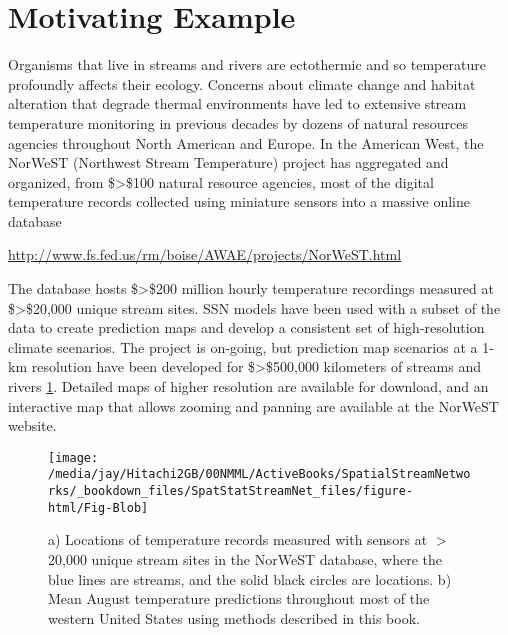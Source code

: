 \documentclass[]{book}
\theoremstyle{definition}
\theoremstyle{definition}
\theoremstyle{definition}
\theoremstyle{remark}
\begin{document}
\hypertarget{motivating-example}{%
\section{Motivating Example}\label{motivating-example}}

Organisms that live in streams and rivers are ectothermic and so
temperature profoundly affects their ecology. Concerns about climate
change and habitat alteration that degrade thermal environments have led
to extensive stream temperature monitoring in previous decades by dozens
of natural resources agencies throughout North American and Europe. In
the American West, the NorWeST (Northwest Stream Temperature) project
has aggregated and organized, from \$\textgreater{}\$100 natural
resource agencies, most of the digital temperature records collected
using miniature sensors into a massive online database

\url{http://www.fs.fed.us/rm/boise/AWAE/projects/NorWeST.html}

The database hosts \$\textgreater{}\$200 million hourly temperature
recordings measured at \$\textgreater{}\$20,000 unique stream sites. SSN
models have been used with a subset of the data to create prediction
maps and develop a consistent set of high-resolution climate scenarios.
The project is on-going, but prediction map scenarios at a 1-km
resolution have been developed for \$\textgreater{}\$500,000 kilometers
of streams and rivers \ref{fig:Fig-Blob}. Detailed maps of higher
resolution are available for download, and an interactive map that
allows zooming and panning are available at the NorWeST website.

\begin{figure}[h]

{\centering \texttt{[image: /media/jay/Hitachi2GB/00NMML/ActiveBooks/SpatialStreamNetworks/\_bookdown\_files/SpatStatStreamNet\_files/figure-html/Fig-Blob]} 

}

\caption{a) Locations of temperature records measured with sensors at $>$20,000 unique stream sites in the NorWeST database, where the blue lines are streams, and the solid black circles are locations. b) Mean August temperature predictions throughout most of the western United States using methods described in this book.}\label{fig:Fig-Blob}
\end{figure}
\end{document}
